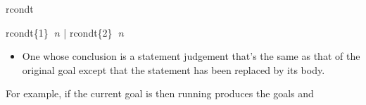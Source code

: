 \begin{tactic}{rcondt}
\begin{tsyntax}{rcondt\{1\} $\;n$ | rcondt\{2\} $\;n$}
\begin{itemize}
    \item One whose conclusion is a \prhl statement judgement that's
      the same as that of the original goal except that the 
      statement has been replaced by its body.
    \end{itemize}

  \medskip
  For example, if the current goal is
   then
  running 
  produces the goals
  and
  \end{tsyntax}
\end{tactic}
